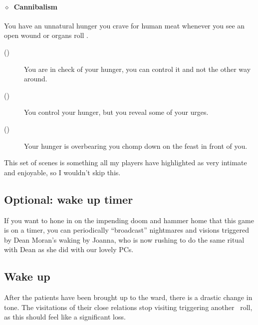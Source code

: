 
\paragraph{\(\diamond\)~Cannibalism}\label{disadv:cannibalism}%
You have an unnatural hunger you crave for human meat whenever you see an open wound or organs roll .
\begin{description}
  \item[()] You are in check of your hunger, you can control it and not the other way around.
  \item[()] You control your hunger, but you reveal some of your urges.
  \item[()] Your hunger is overbearing you chomp down on the feast in front of you.
\end{description}
\KULTrule%

This set of scenes is something all my players have highlighted as very intimate and enjoyable, so I wouldn't skip this.

\subsection*{Optional: wake up timer}
If you want to hone in on the impending doom and hammer home that this game is on a timer, you can periodically “broadcast”
nightmares and visions triggered by Dean Moran's waking by Joanna, who is now rushing to do the same ritual
with Dean as she did with our lovely PCs.

\subsection{Wake up}%
\label{sub:wake_up}

After the patients have been brought up to the ward, there is a drastic change in tone.  The visitations of their close relations
stop visiting triggering another~ roll, as this should feel like a significant loss.

